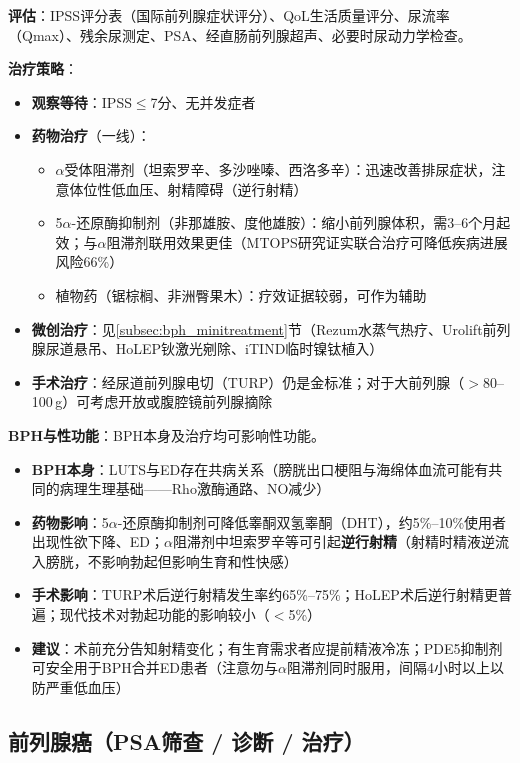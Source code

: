 \textbf{评估}：IPSS评分表（国际前列腺症状评分）、QoL生活质量评分、尿流率（Qmax）、残余尿测定、PSA、经直肠前列腺超声、必要时尿动力学检查。

\textbf{治疗策略}：
\begin{itemize}[leftmargin=2cm]
	\item \textbf{观察等待}：IPSS$\le$7分、无并发症者
	\item \textbf{药物治疗}（一线）：
    \begin{itemize}
    	\item $\alpha$受体阻滞剂（坦索罗辛、多沙唑嗪、西洛多辛）：迅速改善排尿症状，注意体位性低血压、射精障碍（逆行射精）
    	\item 5$\alpha$-还原酶抑制剂（非那雄胺、度他雄胺）：缩小前列腺体积，需3--6个月起效；与$\alpha$阻滞剂联用效果更佳（MTOPS研究证实联合治疗可降低疾病进展风险66\%）
    	\item 植物药（锯棕榈、非洲臀果木）：疗效证据较弱，可作为辅助
    \end{itemize}
	\item \textbf{微创治疗}：见\ref{subsec:bph_minitreatment}节（Rezum水蒸气热疗、Urolift前列腺尿道悬吊、HoLEP钬激光剜除、iTIND临时镍钛植入）
	\item \textbf{手术治疗}：经尿道前列腺电切（TURP）仍是金标准；对于大前列腺（$>$80--100\,g）可考虑开放或腹腔镜前列腺摘除
\end{itemize}

\textbf{BPH与性功能}：BPH本身及治疗均可影响性功能。
\begin{itemize}[leftmargin=2cm]
	\item \textbf{BPH本身}：LUTS与ED存在共病关系（膀胱出口梗阻与海绵体血流可能有共同的病理生理基础——Rho激酶通路、NO减少）
	\item \textbf{药物影响}：5$\alpha$-还原酶抑制剂可降低睾酮双氢睾酮（DHT），约5\%--10\%使用者出现性欲下降、ED；$\alpha$阻滞剂中坦索罗辛等可引起\textbf{逆行射精}（射精时精液逆流入膀胱，不影响勃起但影响生育和性快感）
	\item \textbf{手术影响}：TURP术后逆行射精发生率约65\%--75\%；HoLEP术后逆行射精更普遍；现代技术对勃起功能的影响较小（$<$5\%）
	\item \textbf{建议}：术前充分告知射精变化；有生育需求者应提前精液冷冻；PDE5抑制剂可安全用于BPH合并ED患者（注意勿与$\alpha$阻滞剂同时服用，间隔4小时以上以防严重低血压）
\end{itemize}

\subsection{前列腺癌（PSA筛查 / 诊断 / 治疗）}

